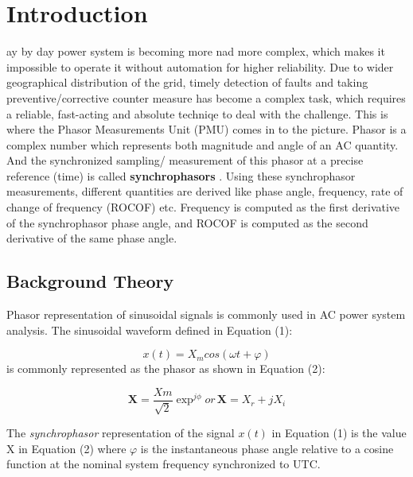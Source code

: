 \section{Introduction}
ay by day power system is becoming more nad more complex, which makes it impossible to operate it without automation for higher reliability. Due to wider geographical distribution of the grid, timely detection of faults and taking preventive/corrective counter measure  has become a complex task, which requires a reliable, fast-acting and absolute techniqe to deal with the challenge. This is where the Phasor Measurements Unit (PMU) comes in to the picture. Phasor is a complex number which represents both magnitude and angle of an AC quantity. And the synchronized sampling/ measurement of this phasor at a precise reference (time) is called \textbf{synchrophasors} \cite{std:c37}. Using these synchrophasor measurements, different quantities are derived like phase angle, frequency, rate of change of frequency (ROCOF) etc. Frequency is computed as the first derivative of the synchrophasor phase angle, and ROCOF is computed as the second derivative of the same phase angle. 

\subsection{Background Theory}
Phasor representation of sinusoidal signals is commonly used in AC power system analysis. The sinusoidal waveform defined in Equation (1):

\begin{equation}
x(t) = X_m cos(\omega t + \varphi)
\end{equation}
is commonly represented as the phasor as shown in Equation (2):

\begin{equation}
\textbf{X} = \frac{Xm}{\sqrt{2}}\exp^{j\phi}
or\hspace{2pt} \textbf{X} = X_r+jX_i
\end{equation}

The \textit{synchrophasor} representation of the signal $x(t)$ in Equation (1) is the value X in Equation (2) where $\varphi$ is the instantaneous phase angle relative to a cosine function at the nominal system frequency synchronized to UTC.

